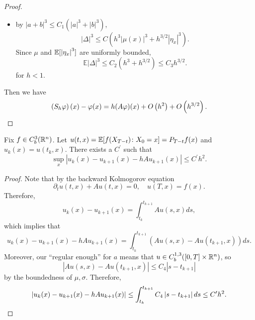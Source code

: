 \begin{proof}
\begin{itemize}
        \item by $|a+b|^3 \leq C_1\left(|a|^3+|b|^3\right)$,
        \begin{equation*}
            |\Delta|^3 \leq C\left(h^3|\mu(x)|^3+h^{3 / 2}\left|\eta_x\right|^3\right) .
        \end{equation*}
        Since $\mu$ and $\mathbb{E}[\left|\eta_x\right|^3]$ are uniformly bounded,
        \begin{equation*}
            \mathbb{E}|\Delta|^3 \leq C_2\left(h^3+h^{3 / 2}\right) \leq C_3 h^{3 / 2} .
        \end{equation*}
        for $h < 1$.
    \end{itemize}
    Then we have
    \begin{equation*}
        \left(S_h \varphi\right)(x)-\varphi(x)=h(A \varphi)(x)+O\left(h^2\right)+O\left(h^{3 / 2}\right). \qedhere
    \end{equation*}
\end{proof}
\begin{lem}\label{lem:discreteu}
    Fix $f \in C^3_b(\mathbb{R}^n)$. Let $u(t,x) = \mathbb{E}[f(X_{T-t}) \colon X_0 = x] = P_{T-t}f(x)$ and $u_k(x) = u(t_k,x)$. There exists a $C^\prime$ such that
    \begin{equation*}
        \sup_x\left|u_k(x)-u_{k+1}(x)-h A u_{k+1}(x)\right| \leq C^\prime h^2 .
    \end{equation*}
\end{lem}
\begin{proof}
    Note that by the backward Kolmogorov equation
    \begin{equation*}
        \partial_tu(t,x) + Au(t,x) = 0,\quad u(T,x) = f(x).
    \end{equation*}
    Therefore,
    \begin{equation*}
        u_k(x)-u_{k+1}(x)=\int_{t_k}^{t_{k+1}} A u(s, x) d s,
    \end{equation*}
    which implies that
    \begin{equation*}
        u_k(x)-u_{k+1}(x)-h A u_{k+1}(x)=\int_{t_k}^{t_{k+1}}\left(A u(s, x)-A u\left(t_{k+1}, x\right)\right) d s.
    \end{equation*}
    Moreover, our ``regular enough'' for $a$ means that $u \in C_b^{1,3}([0,T] \times \mathbb{R}^n)$, so
    \begin{equation*}
        \left|A u(s, x)-A u\left(t_{k+1}, x\right)\right| \leq C_4\left|s-t_{k+1}\right|
    \end{equation*}
    by the boundedness of $\mu,\sigma$. Therefore,
    \begin{equation*}
        \left\lvert u_k(x)-u_{k+1}(x)-h A u_{k+1}(x)\right\lvert \leq \int_{t_k}^{t_{k+1}} C_4\left|s-t_{k+1}\right| d s \leq C^\prime h^2. \qedhere
    \end{equation*}
\end{proof}
